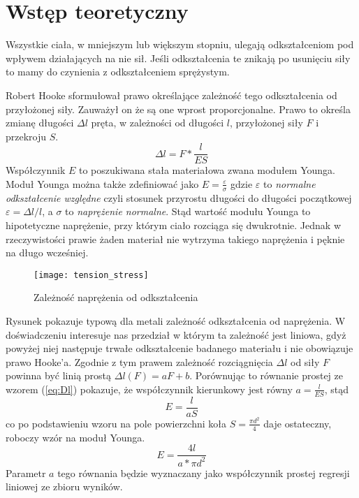 \documentclass[a4paper,10pt,twoside]{article}
\begin{document}
\section{Wstęp teoretyczny}
Wszystkie ciała, w mniejszym lub większym stopniu, ulegają odkształceniom pod wpływem działających na nie sił.
Jeśli odkształcenia te znikają po usunięciu siły to mamy do czynienia z odkształceniem sprężystym.

Robert Hooke sformułował prawo określające zależność tego odkształcenia od przyłożonej siły.
Zauważył on że są one wprost proporcjonalne. Prawo to określa zmianę długości $\Delta l$ pręta, w zależności od długości $l$,
przyłożonej siły $F$ i przekroju $S$.
\begin{equation}
\label{eq:Dl}
\Delta l = F*\frac{l}{ES}
\end{equation}
Współczynnik $E$ to poszukiwana stała materiałowa zwana modułem Younga.
Moduł Younga można także zdefiniować jako $E = \frac{\varepsilon}{\sigma}$
gdzie $\varepsilon$ to \emph{normalne odkształcenie względne} czyli stosunek przyrostu długości do długości początkowej
${\varepsilon = \Delta l / l}$, a $\sigma$ to \emph{naprężenie normalne}. Stąd wartość modułu Younga to hipotetyczne
naprężenie, przy którym ciało rozciąga się dwukrotnie. Jednak w rzeczywistości prawie żaden materiał nie wytrzyma takiego
naprężenia i pęknie na długo wcześniej.

\begin{wrapfigure}{r}{0.4\textwidth}
	\vspace{-30pt}
	\begin{center}
		\texttt{[image: tension\_stress]}
	\end{center}
	\vspace{-20pt}
	\caption{Zależność naprężenia od odkształcenia}
	\label{fig:tension_stress}
\end{wrapfigure}
Rysunek pokazuje typową dla metali zależność odkształcenia od naprężenia. W doświadczeniu interesuje nas przedział w którym ta
zależność jest liniowa, gdyż powyżej niej następuje trwałe odkształcenie badanego materiału i nie obowiązuje prawo Hooke'a.
Zgodnie z tym prawem zależność rozciągnięcia $\Delta l$ od siły $F$ powinna być linią prostą $\Delta l(F) = aF+b$. Porównując
to równanie prostej ze wzorem (\ref{eq:Dl}) pokazuje, że współczynnik kierunkowy jest równy $a=\frac{l}{ES}$, stąd
\begin{equation}
E=\frac{l}{aS}
\end{equation}
co po podstawieniu wzoru na pole powierzchni koła $S=\frac{\pi d^2}{4}$ daje ostateczny, roboczy wzór na moduł Younga.
\begin{equation}
\label{eq:young}
E = \frac{4l}{a*\pi d^2}
\end{equation}
Parametr $a$ tego równania będzie wyznaczany jako współczynnik prostej regresji liniowej ze zbioru wyników.
\end{document}
